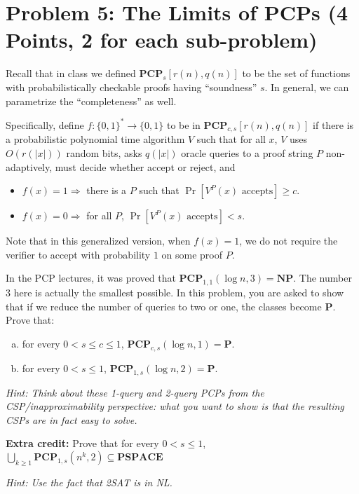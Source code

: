 \documentclass{article}
\newcommand{\mf}[1]{\mathbf{#1}}
\begin{document}
\newpage
\section*{Problem 5: The Limits of PCPs (4 Points, 2 for each sub-problem)}
Recall that in class we defined $\mf{PCP}_s[r(n),q(n)]$ to be the set of functions with probabilistically checkable proofs having ``soundness'' $s$. In general, we can parametrize the ``completeness'' as well. 

Specifically, define $f:\{0,1\}^* \rightarrow \{0,1\}$ to be in $\mf{PCP}_{c,s}[r(n),q(n)]$ if there is a probabilistic polynomial time algorithm $V$ such that for all $x$, $V$ uses $O(r(|x|))$ random bits, asks $q(|x|)$ oracle queries to a proof string $P$ non-adaptively, must decide whether accept or reject, and
\begin{itemize}
	\item
	$f(x) = 1 \Longrightarrow$ there is a $P$ such that $\Pr[V^P(x) \textrm{ accepts}] \geq c$.
	\item
	$f(x) = 0 \Longrightarrow$ for all $P$, $\Pr[V^P(x) \textrm{ accepts}] < s$.
\end{itemize}

Note that in this generalized version, when $f(x) = 1$, we do not require the verifier to accept with probability $1$ on some proof $P$. 

In the PCP lectures, it was proved that $\mf{PCP}_{1,1}(\log n, 3)=\mathbf{NP}$. The number $3$ here is actually the smallest possible. In this problem, you are asked to show that if we reduce the number of queries to two or one, the classes become $\mathbf{P}$. Prove that:
\begin{enumerate}[(a)]
	\item
	for every $0<s\leq  c\leq 1$, $\mf{PCP}_{c,s}(\log n,1)=\mathbf{P}$.
	\item
	for every $0<s\leq 1$, $\mf{PCP}_{1,s}(\log n,2)=\mathbf{P}$.
\end{enumerate} 
\emph{Hint: Think about these 1-query and 2-query PCPs from the CSP/inapproximability perspective: what you want to show is that the resulting CSPs are in fact easy to solve.}

\smallskip

{\bf Extra credit:} Prove that for every $0<s\leq 1$, $\bigcup_{k \geq 1} \mf{PCP}_{1,s}(n^k,2) \subseteq \mf{PSPACE}$

\smallskip

\emph{Hint: Use the fact that 2SAT is in NL.} 
\end{document}

